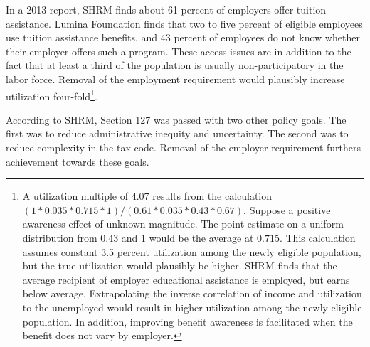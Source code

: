 \documentclass[review]{elsarticle}
\begin{document}
In a 2013 report, SHRM finds about 61 percent of employers offer tuition assistance\cite{cherry2014rejuvenating}.
Lumina Foundation finds that two to five percent of eligible employees use tuition assistance benefits,
and 43 percent of employees do not know whether their employer offers such a program\cite{glover_2017}.
These access issues are in addition to the fact that at least a third of the population is usually non-participatory in the labor force.
Removal of the employment requirement would plausibly increase utilization four-fold\footnote{
    A utilization multiple of 4.07 results from the calculation $(1*0.035*0.715*1) / (0.61*0.035*0.43*0.67)$.
    Suppose a positive awareness effect of unknown magnitude.
    The point estimate on a uniform distribution from $0.43$ and $1$ would be the average at $0.715$.
    This calculation assumes constant 3.5 percent utilization among the newly eligible population,
    but the true utilization would plausibly be higher.
    SHRM finds that the average recipient of employer educational assistance is employed, but earns below average.
    Extrapolating the inverse correlation of income and utilization to the unemployed would result in
    higher utilization among the newly eligible population.
    In addition, improving benefit awareness is facilitated when the benefit does not vary by employer.
}.

According to SHRM, Section 127 was passed with two other policy goals.
The first was to reduce administrative inequity and uncertainty.
The second was to reduce complexity in the tax code.
Removal of the employer requirement furthers achievement towards these goals.
\end{document}
